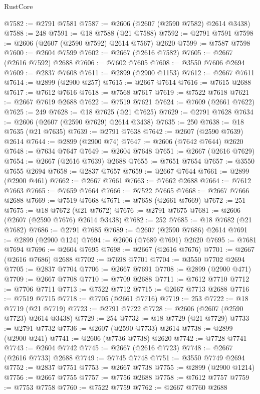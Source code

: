 \begin{lexlean}{RustCore}
\begin{coremodule}
@7582 := @2791 @7581
@7587 := @2606 (@2607 (@2590 @7582) @2614 @3438)
@7588 := 248
@7591 := @18 @7588 (@21 @7588)
@7592 := @2791 @7591
@7598 := @2606 (@2607 (@2590 @7592) @2614 @7567) @2620
@7599 := @7587 @7598
@7600 := @2604 @7599
@7602 := @2667 (@2616 @7582)
@7605 := @2667 (@2616 @7592) @2688
@7606 := @7602 @7605
@7608 := @3550 @7606 @2694
@7609 := @2837 @7608
@7611 := @2899 (@2900 @1153)
@7612 := @2667 @7611
@7614 := @2899 (@2900 @257)
@7615 := @2667 @7614
@7616 := @7615 @2688
@7617 := @7612 @7616
@7618 := @7568 @7617
@7619 := @7522 @7618
@7621 := @2667 @7619 @2688
@7622 := @7519 @7621
@7624 := @7609 (@2661 @7622)
@7625 := 249
@7628 := @18 @7625 (@21 @7625)
@7629 := @2791 @7628
@7634 := @2606 (@2607 (@2590 @7629) @2614 @3438)
@7635 := 250
@7638 := @18 @7635 (@21 @7635)
@7639 := @2791 @7638
@7642 := @2607 (@2590 @7639) @2614
@7644 := @2899 (@2900 @74)
@7647 := @2606 (@7642 @7644) @2620
@7648 := @7634 @7647
@7649 := @2604 @7648
@7651 := @2667 (@2616 @7629)
@7654 := @2667 (@2616 @7639) @2688
@7655 := @7651 @7654
@7657 := @3550 @7655 @2694
@7658 := @2837 @7657
@7659 := @2667 @7644
@7661 := @2899 (@2900 @461)
@7662 := @2667 @7661
@7663 := @7662 @2688
@7664 := @7612 @7663
@7665 := @7659 @7664
@7666 := @7522 @7665
@7668 := @2667 @7666 @2688
@7669 := @7519 @7668
@7671 := @7658 (@2661 @7669)
@7672 := 251
@7675 := @18 @7672 (@21 @7672)
@7676 := @2791 @7675
@7681 := @2606 (@2607 (@2590 @7676) @2614 @3438)
@7682 := 252
@7685 := @18 @7682 (@21 @7682)
@7686 := @2791 @7685
@7689 := @2607 (@2590 @7686) @2614
@7691 := @2899 (@2900 @124)
@7694 := @2606 (@7689 @7691) @2620
@7695 := @7681 @7694
@7696 := @2604 @7695
@7698 := @2667 (@2616 @7676)
@7701 := @2667 (@2616 @7686) @2688
@7702 := @7698 @7701
@7704 := @3550 @7702 @2694
@7705 := @2837 @7704
@7706 := @2667 @7691
@7708 := @2899 (@2900 @471)
@7709 := @2667 @7708
@7710 := @7709 @2688
@7711 := @7612 @7710
@7712 := @7706 @7711
@7713 := @7522 @7712
@7715 := @2667 @7713 @2688
@7716 := @7519 @7715
@7718 := @7705 (@2661 @7716)
@7719 := 253
@7722 := @18 @7719 (@21 @7719)
@7723 := @2791 @7722
@7728 := @2606 (@2607 (@2590 @7723) @2614 @3438)
@7729 := 254
@7732 := @18 @7729 (@21 @7729)
@7733 := @2791 @7732
@7736 := @2607 (@2590 @7733) @2614
@7738 := @2899 (@2900 @241)
@7741 := @2606 (@7736 @7738) @2620
@7742 := @7728 @7741
@7743 := @2604 @7742
@7745 := @2667 (@2616 @7723)
@7748 := @2667 (@2616 @7733) @2688
@7749 := @7745 @7748
@7751 := @3550 @7749 @2694
@7752 := @2837 @7751
@7753 := @2667 @7738
@7755 := @2899 (@2900 @1214)
@7756 := @2667 @7755
@7757 := @7756 @2688
@7758 := @7612 @7757
@7759 := @7753 @7758
@7760 := @7522 @7759
@7762 := @2667 @7760 @2688

\end{coremodule}
\end{lexlean}
